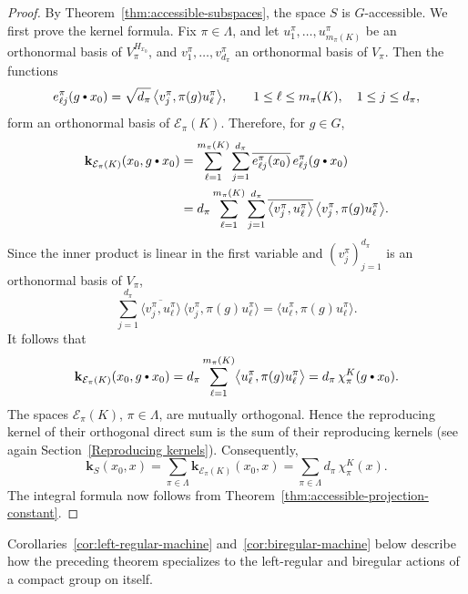 \documentclass[11pt,showkeys]{amsart}
\newcommand{\hbullet}{\mathbin{\vcenter{\hbox{\scalebox{0.7}{$\bullet$}}}}}
\begin{document}
\begin{proof}
By Theorem~\ref{thm:accessible-subspaces}, the space \(S\) is
\(G\)-accessible.
We first prove the kernel formula. Fix \(\pi\in\Lambda\), and let
\(
    u_1^\pi,\ldots,u_{m_\pi(K)}^\pi
\)
be an orthonormal basis of \(V_\pi^{H_{x_0}}\), and
\(
    v_1^\pi,\ldots,v_{d_\pi}^\pi
\)
an orthonormal basis of \(V_\pi\). Then the functions
\[
    e_{\ell j}^\pi(g\hbullet x_0)
    =
    \sqrt{d_\pi}\,
    \bigl\langle v_j^\pi,\pi(g)u_\ell^\pi\bigr\rangle,
    \qquad
    1\leq \ell\leq m_\pi(K),\quad
    1\leq j\leq d_\pi,
\]
form an orthonormal basis of \(\mathcal E_\pi(K)\).
Therefore, for \(g\in G\),
\[
\begin{aligned}
    \mathbf k_{\mathcal E_\pi(K)}
        (x_0,g\hbullet x_0)
    &=
    \sum_{\ell=1}^{m_\pi(K)}
    \sum_{j=1}^{d_\pi}
    \overline{e_{\ell j}^\pi(x_0)}\,
    e_{\ell j}^\pi(g\hbullet x_0)
    \\
    &=
    d_\pi
    \sum_{\ell=1}^{m_\pi(K)}
    \sum_{j=1}^{d_\pi}
    \overline{
        \bigl\langle v_j^\pi,u_\ell^\pi\bigr\rangle
    }\,
    \bigl\langle
        v_j^\pi,\pi(g)u_\ell^\pi
    \bigr\rangle.
\end{aligned}
\]
Since the inner product is linear in the first variable and
\((v_j^\pi)_{j=1}^{d_\pi}\) is an orthonormal basis of \(V_\pi\),
\[
    \sum_{j=1}^{d_\pi}
    \overline{
        \bigl\langle v_j^\pi,u_\ell^\pi\bigr\rangle
    }\,
    \bigl\langle
        v_j^\pi,\pi(g)u_\ell^\pi
    \bigr\rangle
    =
    \bigl\langle
        u_\ell^\pi,\pi(g)u_\ell^\pi
    \bigr\rangle.
\]
It follows that
\[
    \mathbf k_{\mathcal E_\pi(K)}
        (x_0,g\hbullet x_0)
    =
    d_\pi
    \sum_{\ell=1}^{m_\pi(K)}
    \bigl\langle
        u_\ell^\pi,\pi(g)u_\ell^\pi
    \bigr\rangle
        =
    d_\pi\,\chi_\pi^K(g\hbullet x_0).
\]
The spaces \(\mathcal E_\pi(K)\), \(\pi\in\Lambda\), are mutually
orthogonal. Hence the reproducing kernel of their orthogonal direct
sum is the sum of their reproducing kernels (see again Section~\ref{Reproducing kernels}). Consequently,
\[
    \mathbf k_S(x_0,x)
    =
    \sum_{\pi\in\Lambda}
    \mathbf k_{\mathcal E_\pi(K)}(x_0,x)
    =
    \sum_{\pi\in\Lambda}
    d_\pi\,\chi_\pi^K(x).
\]
The integral formula now follows from
Theorem~\ref{thm:accessible-projection-constant}.
\end{proof}





Corollaries~\ref{cor:left-regular-machine}
and~\ref{cor:biregular-machine} below describe how the preceding theorem
specializes to the left-regular and biregular actions of a compact group
on itself.
\end{document}
